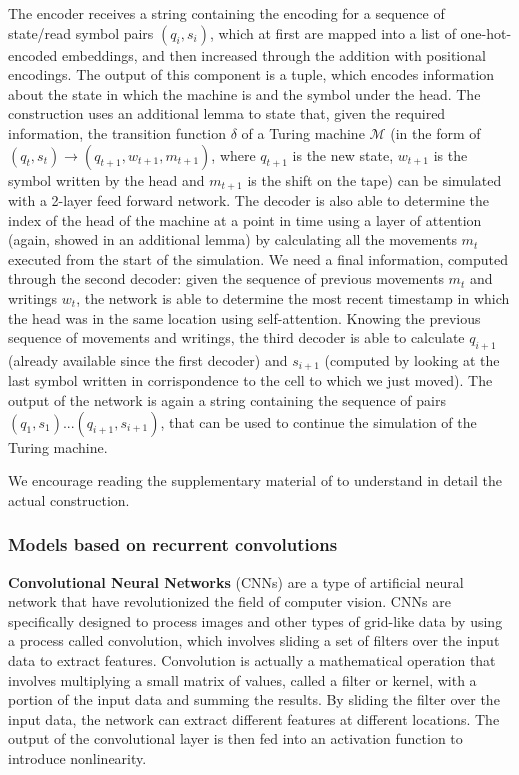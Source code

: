 \documentclass{article}
\begin{document}
The encoder receives a string containing the encoding for a sequence of state/read symbol pairs $(q_i,s_i)$, which at first are mapped into a list of one-hot-encoded embeddings, and then increased through the addition with positional encodings. The output of this component is a tuple, which encodes information about the state in which the machine is and the symbol under the head. The construction uses an additional lemma to state that, given the required information, the transition function $\delta$ of a Turing machine $\mathcal{M}$ (in the form of $(q_t,s_t) \to (q_{t+1}, w_{t+1}, m_{t+1})$, where $q_{t+1}$ is the new state, $w_{t+1}$ is the symbol written by the head and $m_{t+1}$ is the shift on the tape) can be simulated with a 2-layer feed forward network. The decoder is also able to determine the index of the head of the machine at a point in time using a layer of attention (again, showed in an additional lemma) by calculating all the movements $m_t$ executed from the start of the simulation. We need a final information, computed through the second decoder: given the sequence of previous movements $m_t$ and writings $w_t$, the network is able to determine the most recent timestamp in which the head was in the same location using self-attention. Knowing the previous sequence of movements and writings, the third decoder is able to calculate $q_{i+1}$ (already available since the first decoder) and $s_{i+1}$ (computed by looking at the last symbol written in corrispondence to the cell to which we just moved). The output of the network is again a string containing the sequence of pairs $(q_1,s_1)...(q_{i+1},s_{i+1})$, that can be used to continue the simulation of the Turing machine.

We encourage reading the supplementary material of \cite{PER19} to understand in detail the actual construction.

\subsubsection{Models based on recurrent convolutions}
\textbf{Convolutional Neural Networks} (CNNs) are a type of artificial neural network that have revolutionized the field of computer vision. CNNs are specifically designed to process images and other types of grid-like data by using a process called convolution, which involves sliding a set of filters over the input data to extract features. Convolution is actually a mathematical operation that involves multiplying a small matrix of values, called a filter or kernel, with a portion of the input data and summing the results. By sliding the filter over the input data, the network can extract different features at different locations. The output of the convolutional layer is then fed into an activation function to introduce nonlinearity.
\end{document}
